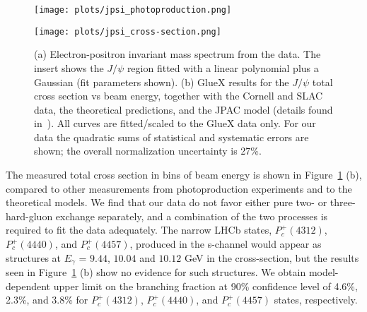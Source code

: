 \documentclass[a4paper]{jpconf}
\begin{document}
\begin{figure}[h]
    \centering
    \begin{minipage}{16pc}
        \texttt{[image: plots/jpsi\_photoproduction.png]}
    \end{minipage}\hspace{3pc}%
    \begin{minipage}{16pc}
        \texttt{[image: plots/jpsi\_cross-section.png]}
    \end{minipage}
    \caption{\label{fig.4} (a) Electron-positron invariant mass spectrum from the data. The insert shows the $J/\psi$ region fitted with a linear polynomial plus a Gaussian (fit parameters shown). (b) GlueX results for the $J/\psi$ total cross section vs beam energy, together with the Cornell and SLAC data, the theoretical predictions, and the JPAC model (details found in~\cite{ref.5}). All curves are fitted/scaled to the GlueX data only. For our data the quadratic sums of statistical and systematic errors are shown; the overall normalization uncertainty is 27\%.}
\end{figure}

The measured total cross section in bins of beam energy is shown in Figure~\ref{fig.4} (b), compared to other measurements from photoproduction experiments and to the theoretical models. We find that our data do not favor either pure two- or three-hard-gluon exchange separately, and a combination of the two processes is required to fit the data adequately.
The narrow LHCb states, $P^{+}_{c}(4312)$, $P^{+}_{c}(4440)$, and $P^{+}_{c}(4457)$, produced in the s-channel would appear as structures at $E_{\gamma}$ = $9.44$, $10.04$ and $10.12$ GeV in the cross-section, but the results seen in Figure~\ref{fig.4} (b) show no evidence for such structures. We obtain model-dependent upper limit on the branching fraction at 90\% confidence level of 4.6\%, 2.3\%, and 3.8\% for $P^{+}_{c}(4312)$, $P^{+}_{c}(4440)$, and $P^{+}_{c}(4457)$ states, respectively.
\end{document}
